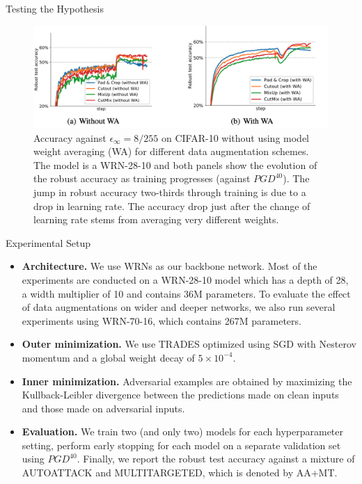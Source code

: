 \begin{frame}{Testing the Hypothesis}
        \begin{figure}
            \centering
            \includegraphics[height=.4\textheight]{pic/data_aug_wa.png}
            \caption{Accuracy against $\epsilon_\infty = 8/255$ on CIFAR-10 without using model weight averaging (WA) for different data augmentation schemes. The model is a WRN-28-10 and both panels show the evolution of the robust accuracy as training progresses (against $PGD^{40}$). The jump in robust accuracy two-thirds through training is due to a drop in learning rate. The accuracy drop just after the change of learning rate stems from averaging very different weights.}
            \label{fig:data_aug_wa}
        \end{figure}
\end{frame}

\begin{frame}{Experimental Setup}
    \begin{itemize}[<+-| alert@+>] %
        \item \textbf{Architecture.} We use WRNs as our backbone network. Most of the experiments are conducted on a WRN-28-10 model which has a depth of 28, a width multiplier of 10 and contains 36M parameters. To evaluate the effect of data augmentations on wider and deeper networks, we also run several experiments using WRN-70-16, which contains 267M parameters.
        \item \textbf{Outer minimization.} We use TRADES optimized using SGD with Nesterov momentum and a global weight decay of $5 \times 10^{-4}$.
        \item \textbf{Inner minimization.} Adversarial examples are obtained by maximizing the Kullback-Leibler divergence between the predictions made on clean inputs and those made on adversarial inputs. 
        \item \textbf{Evaluation.} We train two (and only two) models for each hyperparameter setting, perform early stopping for each model on a separate validation set using $PGD^{40}$. Finally, we report the robust test accuracy against a mixture of AUTOATTACK and MULTITARGETED, which is denoted by AA+MT.
    \end{itemize}
\end{frame}